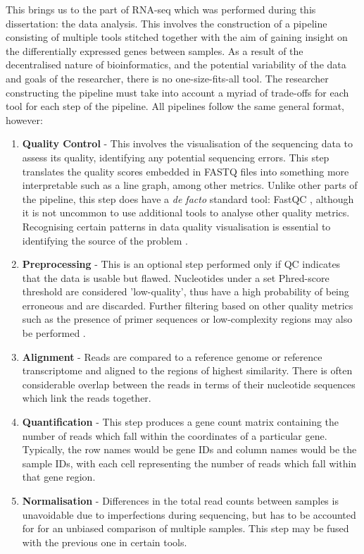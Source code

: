 This brings us to the part of RNA-seq which was performed during this dissertation: the data analysis. This involves the construction of a pipeline consisting of multiple tools stitched together with the aim of gaining insight on the differentially expressed genes between samples. As a result of the decentralised nature of bioinformatics, and the potential variability of the data and goals of the researcher, there is no one-size-fits-all tool. The researcher constructing the pipeline must take into account a myriad of trade-offs for each tool for each step of the pipeline. All pipelines follow the same general format, however: 
\begin{enumerate}
\item \textbf{Quality Control} - This involves the visualisation of the sequencing data to assess its quality, identifying any potential sequencing errors. This step translates the quality scores embedded in FASTQ files into something more interpretable such as a line graph, among other metrics. Unlike other parts of the pipeline, this step does have a \textit{de facto} standard tool: FastQC \citep{andrews2010fastqc}, although it is not uncommon to use additional tools to analyse other quality metrics. Recognising certain patterns in data quality visualisation is essential to identifying the source of the problem \citep{stoler2021sequencing}.
\item \textbf{Preprocessing} - This is an optional step performed only if \ac{QC} indicates that the data is usable but flawed. Nucleotides under a set Phred-score threshold are considered 'low-quality', thus have a high probability of being erroneous and are discarded. Further filtering based on other quality metrics such as the presence of primer sequences or low-complexity regions may also be performed \citep{martin2011cutadapt, prinseq++}.
\item \textbf{Alignment} - Reads are compared to a reference genome or reference transcriptome and aligned to the regions of highest similarity. There is often considerable overlap between the reads in terms of their nucleotide sequences which link the reads together.
\item \textbf{Quantification} - This step produces a gene count matrix containing the number of reads which fall within the coordinates of a particular gene. Typically, the row names would be gene IDs and column names would be the sample IDs, with each cell representing the number of reads which fall within that gene region.
\item \textbf{Normalisation} - Differences in the total read counts between samples is unavoidable due to imperfections during sequencing, but has to be accounted for for an unbiased comparison of multiple samples. This step may be fused with the previous one in certain tools. 

\end{enumerate}

